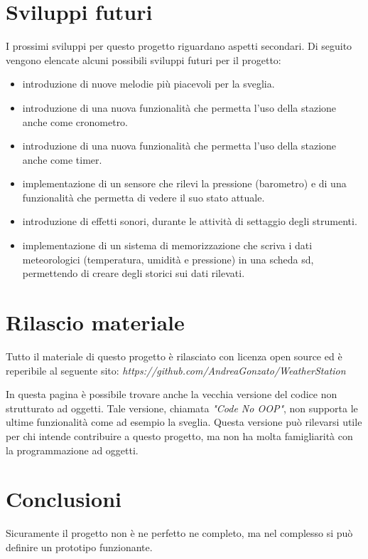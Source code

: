 \documentclass[paper=a4, fontsize=10pt]{scrartcl}
\begin{document}
\section{Sviluppi futuri}
I prossimi sviluppi per questo progetto riguardano aspetti secondari.
Di seguito vengono elencate alcuni possibili sviluppi futuri per il progetto:
\begin{itemize}
\item introduzione di nuove melodie più piacevoli per la sveglia.

\item introduzione di una nuova funzionalità che permetta l'uso della stazione anche come cronometro.

\item introduzione di una nuova funzionalità che permetta l'uso della stazione anche come timer.

\item implementazione di un sensore che rilevi la pressione (barometro) e di una funzionalità che permetta di vedere il suo stato attuale.

\item introduzione di effetti sonori, durante le attività di settaggio degli strumenti.

\item implementazione di un sistema di memorizzazione che scriva i dati meteorologici (temperatura, umidità e pressione) in una scheda sd, permettendo di creare degli storici sui dati rilevati.

\end{itemize}


\section{Rilascio materiale}
Tutto il materiale di questo progetto è rilasciato con licenza open source ed è reperibile al seguente sito:
\textit{https://github.com/AndreaGonzato/WeatherStation}

In questa pagina è possibile trovare anche la vecchia versione del codice non strutturato ad oggetti. Tale versione, chiamata \textit{"Code No OOP"}, non supporta le ultime funzionalità come ad esempio la sveglia. Questa versione può rilevarsi utile per chi intende contribuire a questo progetto, ma non ha molta famigliarità con la programmazione ad oggetti.


\section{Conclusioni}
Sicuramente il progetto non è ne perfetto ne completo, ma nel complesso si può definire un prototipo funzionante.
\end{document}
